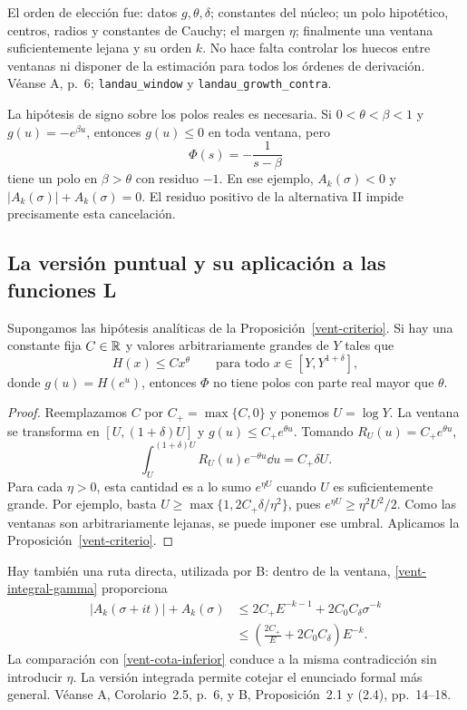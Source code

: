El orden de elección fue: datos $g,\theta,\delta$; constantes del núcleo;
un polo hipotético, centros, radios y constantes de Cauchy; el margen
$\eta$; finalmente una ventana suficientemente lejana y su orden $k$.
No hace falta controlar los huecos entre ventanas ni disponer de la
estimación para todos los órdenes de derivación.
Véanse A, p.~6; \texttt{landau\_window} y
\texttt{landau\_growth\_contra}.

La hipótesis de signo sobre los polos reales es necesaria.
Si $0<\theta<\beta<1$ y $g(u)=-e^{\beta u}$, entonces $g(u)\le0$
en toda ventana, pero
\[
 \Phi(s)=-\frac1{s-\beta}
\]
tiene un polo en $\beta>\theta$ con residuo $-1$.
En ese ejemplo, $A_k(\sigma)<0$ y
$|A_k(\sigma)|+A_k(\sigma)=0$. El residuo positivo de la
alternativa II impide precisamente esta cancelación.

\subsection{La versión puntual y su aplicación a las funciones L}

\begin{proposicion}
\label{vent-corolario}
Supongamos las hipótesis analíticas de la Proposición~\ref{vent-criterio}.
Si hay una constante fija $C\in\mathbb{R}$ y valores arbitrariamente grandes
de $Y$ tales que
\begin{equation}
 H(x)\le Cx^\theta
 \qquad\text{para todo }x\in[Y,Y^{1+\delta}],
 \label{vent-cota-puntual}
\end{equation}
donde $g(u)=H(e^u)$, entonces $\Phi$ no tiene polos con parte real
mayor que $\theta$.
\end{proposicion}

\begin{proof}
Reemplazamos $C$ por $C_+=\max\{C,0\}$ y ponemos $U=\log Y$.
La ventana se transforma en $[U,(1+\delta)U]$ y
$g(u)\le C_+e^{\theta u}$. Tomando $R_U(u)=C_+e^{\theta u}$,
\[
 \int_U^{(1+\delta)U}R_U(u)e^{-\theta u}\dd u=C_+\delta U.
\]
Para cada $\eta>0$, esta cantidad es a lo sumo $e^{\eta U}$ cuando
$U$ es suficientemente grande. Por ejemplo, basta
$U\ge\max\{1,2C_+\delta/\eta^2\}$, pues
$e^{\eta U}\ge\eta^2U^2/2$.
Como las ventanas son arbitrariamente lejanas, se puede imponer
ese umbral. Aplicamos la Proposición~\ref{vent-criterio}.
\end{proof}

Hay también una ruta directa, utilizada por B: dentro de la ventana,
\eqref{vent-integral-gamma} proporciona
\begin{equation}
 \begin{aligned}
 |A_k(\sigma+it)|+A_k(\sigma)
 &\le 2C_+E^{-k-1}+2C_0C_\delta\sigma^{-k}\\
 &\le\left(\frac{2C_+}{E}+2C_0C_\delta\right)E^{-k}.
 \end{aligned}
 \label{vent-ruta-puntual}
\end{equation}
La comparación con \eqref{vent-cota-inferior} conduce a la misma
contradicción sin introducir $\eta$. La versión integrada permite
cotejar el enunciado formal más general.
Véanse A, Corolario~2.5, p.~6, y B, Proposición~2.1 y (2.4),
pp.~14--18.

